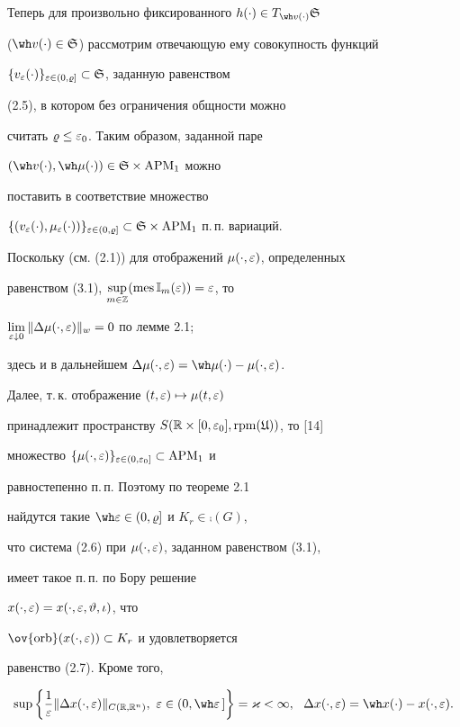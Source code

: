 Теперь для произвольно фиксированного $h(\cdot)\in T_{\wh v(\cdot)}\gS$


($\wh v(\cdot)\in\gS$) рассмотрим отвечающую ему совокупность функций


$\{v_{\varepsilon}(\cdot)\}_{\varepsilon\in(0,\varrho]}\subset\frak S$, заданную равенством


(2.5), в котором без ограничения общности можно


считать $\varrho\le\varepsilon_{0}$. Таким образом, заданной паре


$(\wh v(\cdot),\wh\mu(\cdot))\in\gS\times \APM_{1}$ можно


поставить в соответствие множество


$\{(v_{\ve}(\cdot),\mu_{\ve}(\cdot))\}_{\ve\in(0,\vr]}


\subset\gS\times \APM_{1}$ п.\,п. вариаций.


Поскольку (см. (2.1)) для отображений $\mu(\cdot,\varepsilon)$, определенных


равенством (3.1), $\sup\limits_{m\in\Bbb Z}(\operatorname{mes}\Bbb I_{m}(\varepsilon))=\varepsilon$, то


$\lim\limits_{\varepsilon\downarrow0}\|\Delta\mu(\cdot,\varepsilon)\|_{w}=0$ по лемме 2.1;


здесь и в дальнейшем $\Dl\mu(\cdot,\ve)=\wh\mu(\cdot)-\mu(\cdot,\ve)$.


Далее, т.\,к. отображение $(t,\varepsilon)\mapsto\mu(t,\varepsilon)$


принадлежит пространству $S(\Bbb R\times[0,\varepsilon_0],\operatorname{rpm}(\frak U))$, то [14]


множество $\{\mu(\cdot,\varepsilon)\}_{\varepsilon\in(0,\varepsilon_{0}]}\subset \operatorname{APM}_{1}$ и


равностепенно п.\,п. Поэтому по теореме 2.1


найдутся такие $\wh\ve\in(0,\vr]$ и $K_{r}\in\comp(G)$,


что система (2.6) при $\mu(\cdot,\varepsilon)$, заданном равенством (3.1),


имеет такое п.\,п. по Бору решение


$x(\cdot,\varepsilon)=x(\cdot,\varepsilon,\vartheta,\iota)$, что


$\ov{\orb}(x(\cdot,\ve))\subset K_{r}$ и удовлетворяется


равенство (2.7). Кроме того,


\begin{equation}


\sup\bigg\{\frac{1}{\ve}\|\Dl x(\cdot,\ve)\|_{C(\R,\R^n)},


\ \ve\in(0,\wh\ve\,]\bigg\}=\ak<\infty,\ \ \Dl x(\cdot,\ve)=\wh x(\cdot)


-x(\cdot,\ve).


\end{equation}






